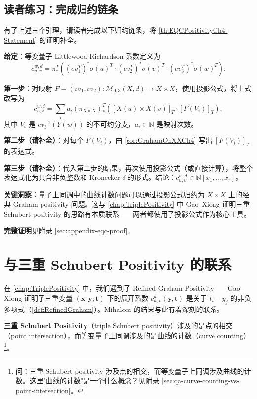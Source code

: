 \subsection{读者练习：完成归约链条}
\label{sec:ProofChallengeCh4}

有了上述三个引理，请读者完成以下归约链条，将 \cref{th:EQCPositivityCh4-Statement} 的证明补全。

\textbf{给定}：等变量子 Littlewood-Richardson 系数定义为
$$c_{u,v}^{w,d} = \pi_*^T\left((ev_1^T)^* \sigma(u)^T \cdot (ev_2^T)^* \sigma(v)^T \cdot (ev_3^T)^* \widetilde{\sigma}(w)^T\right).$$

\textbf{第一步}：对映射 $F = (ev_1, ev_2): \overline{\mathcal{M}}_{0,3}(X,d) \to X \times X$，使用投影公式，将上式改写为
$$c_{u,v}^{w,d} = \sum_i a_i (\pi_{X \times X})_*^T\left([X(u) \times X(v)]_T \cdot [F(V_i)]_T\right),$$
其中 $V_i$ 是 $ev_3^{-1}(Y(w))$ 的不可约分支，$a_i \in \mathbb{N}$ 是映射次数。

\textbf{第二步（请补全）}：对每个 $F(V_i)$，由 \cref{cor:GrahamOnXXCh4} 写出 $[F(V_i)]_T$ 的表达式。

\textbf{第三步（请补全）}：代入第二步的结果，再次使用投影公式（或直接计算），将整个表达式化为只含非负整数和 Kronecker $\delta$ 的形式。结论：$c_{u,v}^{w,d} \in \mathbb{N}[x_1,\ldots,x_r]$。

\textbf{关键洞察}：量子上同调中的曲线计数问题可以通过投影公式归约为 $X \times X$ 上的经典 Graham positivity 问题。这与 \cref{chap:TriplePositivity} 中 Gao--Xiong \cite{GX2025} 证明三重 Schubert positivity 的思路有本质联系——两者都使用了投影公式作为核心工具。

\textbf{完整证明}见附录 \cref{sec:appendix-eqc-proof}。

\section{与三重 Schubert Positivity 的联系}

\label{sec:ConnectionToTripleCh4}

在 \cref{chap:TriplePositivity} 中，我们遇到了 Refined Graham Positivity——Gao--Xiong \cite{GX2025} 证明了三重变量 $(\mathbf{x}; \mathbf{y}; \mathbf{t})$ 下的展开系数 $c^w_{u,v}(\mathbf{y}, \mathbf{t})$ 是关于 $t_i - y_j$ 的非负多项式（\cref{def:RefinedGraham}）。Mihalcea 的结果与此有着深刻的联系。

\textbf{三重 Schubert Positivity}（triple Schubert positivity）涉及的是点的相交（point intersection），而等变量子上同调涉及的是曲线的计数（curve counting）\footnote{问：三重 Schubert positivity 涉及点的相交，而等变量子上同调涉及曲线的计数。这里"曲线的计数"是一个什么概念？见附录 \cref{sec:qa-curve-counting-vs-point-intersection}。}。

